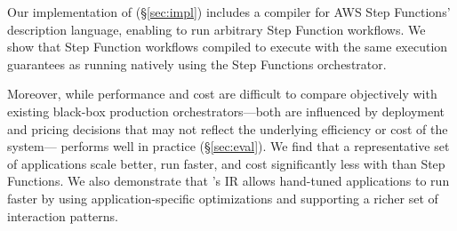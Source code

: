 

Our implementation of \name{} (\S\ref{sec:impl}) includes a compiler for AWS
Step Functions' description language, enabling \name{} to run arbitrary Step
Function workflows. We show that Step Function workflows compiled to \name{}
execute with the same execution guarantees as running natively using the Step
Functions orchestrator.

Moreover, while performance and cost are difficult to compare objectively with
existing black-box production orchestrators---both are influenced by
deployment and pricing decisions that may not reflect the underlying
efficiency or cost of the system---\name{} performs well in practice
(\S\ref{sec:eval}). We find that a representative set of applications scale
better, run faster, and cost significantly less with \name{} than Step
Functions. We also demonstrate that \name{}'s IR allows hand-tuned
applications to run faster by using application-specific optimizations and
supporting a richer set of interaction patterns.
